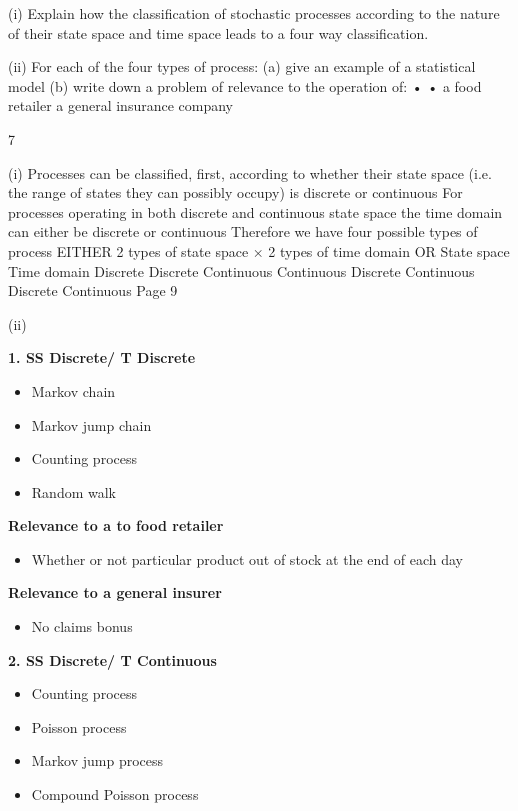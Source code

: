 \documentclass[a4paper,12pt]{article}
\begin{document}
\item (i) Explain how the classification of stochastic processes according to the nature
of their state space and time space leads to a four way classification.

\item (ii) For each of the four types of process:
(a) give an example of a statistical model
(b) write down a problem of relevance to the operation of:
•
•
a food retailer
a general insurance company


\newpage

7
\item (i)
Processes can be classified, first, according to whether their state space (i.e.
the range of states they can possibly occupy) is discrete or continuous
For processes operating in both discrete and continuous state space the time
domain can either be discrete or continuous
Therefore we have four possible types of process
EITHER
2 types of state space × 2 types of time domain
OR
State space Time domain
Discrete
Discrete
Continuous
Continuous Discrete
Continuous
Discrete
Continuous
Page 9%
\item (ii)



\noindent \textbf{1. SS Discrete/
T Discrete}
\begin{itemize}
\item Markov chain
\item Markov jump chain 
\item Counting process
\item Random walk
\end{itemize}

\noindent \textbf{Relevance to a  to food retailer }
\begin{itemize}
\item Whether or not
particular product out
of stock at the end of
each day
\end{itemize}
\noindent \textbf{Relevance to a general insurer}
\begin{itemize}
\item No claims bonus
\end{itemize}

\noindent \textbf{2. SS Discrete/
T Continuous }
\begin{itemize}
\item Counting process
\item Poisson process
\item Markov jump process
\item Compound Poisson process
\end{itemize}
\end{document}
